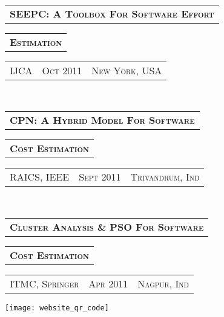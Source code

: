 \documentclass[10pt,a4paper,oneside]{article}
\begin{document}
\begin{minipage}[t]{0.33\textwidth}
        \vspace{10pt}\\
        \begin{tabular}{c}
            \textbf{\normalsize SEEPC: A T\textsc{oolbox}
            F\textsc{or} S\textsc{oftware} E\textsc{ffort}}
        \end{tabular}
        \begin{tabular}{c}
            \textbf{E\textsc{stimation}}
       \end{tabular}
        \textcolor{light-gray}{
            \begin{tabular}{c|c|c}
                \textmd{\normalsize IJCA}
                &{\small O\textsc{ct 2011}}
                &{\small N\textsc{ew} Y\textsc{ork}, USA}
            \end{tabular}
        }\\ 
        \begin{tabular}{c}
            \textbf{\normalsize CPN: A H\textsc{ybrid}
            M\textsc{odel} F\textsc{or} S\textsc{oftware}}\\
        \end{tabular}
        \begin{tabular}{c}
            \textbf{C\textsc{ost} E\textsc{stimation}}
        \end{tabular}
        \textcolor{light-gray}{
            \begin{tabular}{c|c|c}
                 {\small RAICS, IEEE}
                &{\small S\textsc{ept 2011}}
                &{\small T\textsc{rivandrum}, I\textsc{nd}}
            \end{tabular}
        }\\
        \begin{tabular}{c}
       	    \textbf{\normalsize C\textsc{luster} A\textsc{nalysis} \& PSO F\textsc{or} S\textsc{oftware}}
        \end{tabular}
        \begin{tabular}{c}
            \textbf{C\textsc{ost} E\textsc{stimation}}
        \end{tabular}
        \textcolor{light-gray}{
            \begin{tabular}{c|c|c}
                \textmd{\normalsize ITMC, S\textsc{pringer}}
                &{\small A\textsc{pr 2011}}
                &{\small N\textsc{agpur}, I\textsc{nd}}
            \end{tabular}
        }
        \begin{center}
            \texttt{[image: website\_qr\_code]}
        \end{center}
    \end{minipage}
\end{document}
